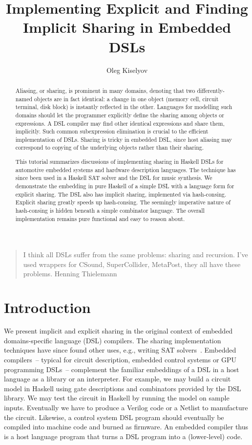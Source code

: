 \documentclass[submission,copyright,creativecommons]{eptcs}
\title{Implementing Explicit and Finding Implicit Sharing in Embedded DSLs}
\author{Oleg Kiselyov
\email{oleg@okmij.org}}
\begin{document}
\maketitle

\begin{abstract}   
Aliasing, or sharing, is prominent in many domains, denoting that two
differently-named objects are in fact identical: a change in one
object (memory cell, circuit terminal, disk block) is instantly   
reflected in the other.  Languages for modelling such domains should
let the programmer explicitly define the sharing among objects or
expressions. A DSL compiler may find other identical expressions and
share them, implicitly. Such common subexpression elimination is
crucial to the efficient implementation of DSLs. Sharing is tricky in
embedded DSL, since host aliasing may correspond to copying of the
underlying objects rather than their sharing.
  
This tutorial summarizes discussions of implementing sharing in
Haskell DSLs for automotive embedded systems and hardware description 
languages. The technique has since been used in a Haskell SAT solver
and the DSL for music synthesis. We demonstrate the embedding in pure
Haskell of a simple DSL with a language form for explicit
sharing. The DSL also has implicit sharing, implemented via
hash-consing. Explicit sharing greatly speeds up hash-consing. The
seemingly imperative nature of hash-consing is hidden beneath a simple
combinator language. The overall implementation remains pure
functional and easy to reason about.
\end{abstract}

\begin{quote}
I think all DSLs suffer from the same problems:
sharing and recursion. I've used wrappers for CSound, SuperCollider,
MetaPost, they all have these problems.
\rm Henning Thielemann~\cite{Thielemann}
\end{quote}


\section{Introduction}

We present implicit and explicit sharing in the original context of
embedded domains-specific language (DSL) compilers. The sharing
implementation techniques have since found other uses, e.g., writing SAT
solvers~\cite{funsat}. Embedded compilers~-- typical for circuit description,
embedded control systems or GPU programming DSLs~-- complement the
familiar embeddings of a DSL in a host language as a library or an
interpreter. For example, we may build a circuit model in
Haskell using gate descriptions and combinators provided by the DSL
library. We may test the circuit in Haskell by running the model
on sample inputs. Eventually we have to produce a Verilog
code or a Netlist to manufacture the circuit. Likewise, a control
system DSL program should eventually be compiled into machine code and
burned as firmware. An embedded compiler thus is a host language
program that turns a DSL program into a (lower-level) code.
\end{document}
